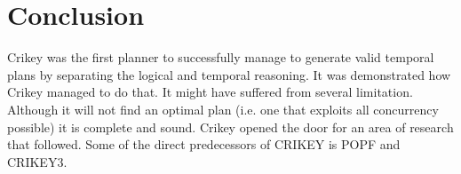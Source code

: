 \documentclass
[a4paper
,english
,parskip=half
,bibliography=totoc
]{scrreprt}
\begin{document}
    \section{Conclusion} 
    Crikey was the first planner to successfully manage to generate valid temporal plans by separating the logical and temporal reasoning. It was demonstrated how Crikey managed to do that. It might have suffered from several limitation. Although it will not find an optimal plan (i.e. one that exploits all concurrency possible) it is complete and sound. Crikey opened the door for an area of research that followed. Some of the direct predecessors of CRIKEY is POPF and CRIKEY3.




\listoffigures



\end{document}
